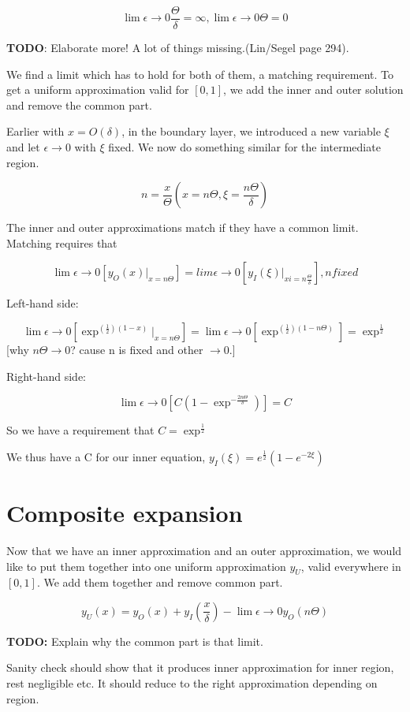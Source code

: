 \documentclass[12pt]{report}
\begin{document}
\begin{equation}
\lim \epsilon \to 0 \frac \Theta \delta = \infty, \lim \epsilon \to 0 \Theta = 0
\end{equation}

\textbf{TODO}:  Elaborate more! A lot of things missing.(Lin/Segel page 294).

We find a limit which has to hold for both of them, a matching
requirement. To get a uniform approximation valid for $[0,1]$, we add the
inner and outer solution and remove the common part.

Earlier with $x=O(\delta)$, in the boundary layer, we introduced a new
variable $\xi$ and let $\epsilon \to 0$ with $\xi$ fixed. We now do
something similar for the intermediate region.

$$n = \frac x \Theta (x = n \Theta, \xi = \frac{n \Theta}{\delta})$$

The inner and outer approximations match if they have a common
limit. Matching requires that

$$\lim \epsilon \to 0[y_O(x) |_{x=n \Theta}] = lim \epsilon \to
0[y_I(\xi)|_{xi=n \frac \Theta \delta}], n fixed$$

Left-hand side:

$$\lim \epsilon \to 0[\exp^{(\frac 1 2)(1-x)} |_{x=n \Theta}] = \lim
\epsilon \to 0[\exp^{(\frac 1 2)(1- n \Theta)}] = \exp^{\frac 1 2} $$
[why $n \Theta \to 0$?  cause n is fixed and other $\to 0$.]

Right-hand side:

$$\lim \epsilon \to 0[C(1-\exp^{-\frac{2n \Theta}{\delta}})] = C$$

So we have a requirement that $C = \exp^{\frac 1 2}$

We thus have a C for our inner equation,
$y_I(\xi) = e^{\frac 1 2}(1-e^{-2\xi})$

\section{Composite expansion}

Now that we have an inner approximation and an outer approximation, we
would like to put them together into one uniform approximation $y_U$,
valid everywhere in $[0,1]$. We add them together and remove common part.

$$y_U(x) = y_O(x) + y_I(\frac x \delta) - \lim \epsilon \to 0 y_O(n \Theta)$$

\textbf{TODO:} Explain why the common part is that limit.

Sanity check should show that it produces inner approximation for
inner region, rest negligible etc. It should reduce to the right
approximation depending on region.
\end{document}
